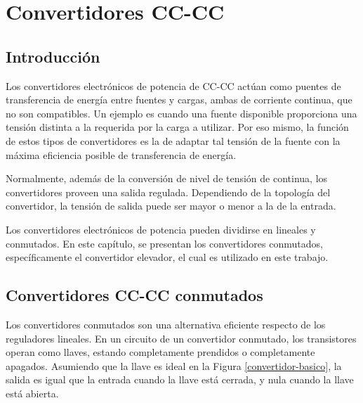 \chapter{Convertidores CC-CC}
\label{convertidores-cc-cc}

\section{Introducción}

Los convertidores electrónicos de potencia de CC-CC actúan como puentes de transferencia de energía entre fuentes y cargas, ambas de corriente continua, que no son compatibles. Un ejemplo es cuando una fuente disponible proporciona una tensión distinta a la requerida por la carga a utilizar. Por eso mismo, la función de estos tipos de  convertidores es la de adaptar tal tensión de la fuente con la máxima eficiencia posible de transferencia de energía.

Normalmente, además de la conversión de nivel de tensión de continua, los convertidores proveen una salida regulada. Dependiendo de la topología del convertidor, la tensión de salida puede ser mayor o menor a la de la entrada.

Los convertidores electrónicos de potencia pueden dividirse en lineales y conmutados. En este capítulo, se presentan los convertidores conmutados, específicamente el convertidor elevador, el cual es utilizado en este trabajo.

\section{Convertidores CC-CC conmutados}

Los convertidores conmutados son una alternativa eficiente respecto de los reguladores lineales. En un circuito de un convertidor conmutado, los transistores operan como llaves, estando completamente prendidos o completamente apagados. Asumiendo que la llave es ideal en la Figura \ref{convertidor-basico}, la salida es igual que la entrada cuando la llave está cerrada, y nula cuando la llave está abierta.


